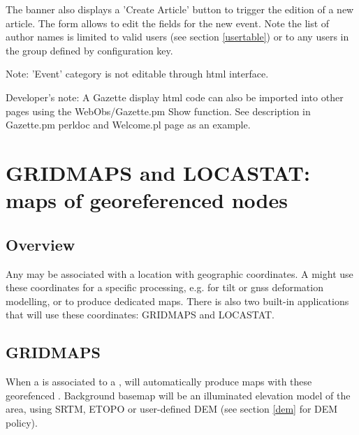 The banner also displays a 'Create Article' button to trigger the edition of a new article. The form allows to edit the fields for the new event. Note the list of author names is limited to valid users (see section \ref{usertable}) or to any users in the group defined by  configuration key.


Note: 'Event' category is not editable through html interface.

Developer's note: A Gazette display html code can also be imported into other pages using the WebObs/Gazette.pm 
Show function. See description in Gazette.pm perldoc and Welcome.pl page as an example.

\newpage
\section{GRIDMAPS and LOCASTAT: maps of georeferenced nodes}

\subsection{Overview}

Any  may be associated with a location with geographic coordinates. A  might use these coordinates for a specific processing, e.g. for tilt or gnss deformation modelling, or to produce dedicated maps. There is also two built-in applications that will use these coordinates: GRIDMAPS and LOCASTAT.

\subsection{GRIDMAPS}
\label{gridmaps}

When a  is associated to a , \webobs will automatically produce maps with these georefenced . Background basemap will be an illuminated elevation model of the area, using SRTM, ETOPO or user-defined DEM (see section \ref{dem} for DEM policy).

